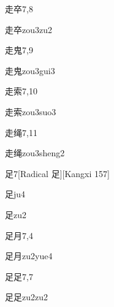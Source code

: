 \begin{entry}{走卒}{7,8}
  \begin{phonetics}{走卒}{zou3zu2}
  \end{phonetics}
\end{entry}

\begin{entry}{走鬼}{7,9}
  \begin{phonetics}{走鬼}{zou3gui3}
  \end{phonetics}
\end{entry}

\begin{entry}{走索}{7,10}
  \begin{phonetics}{走索}{zou3suo3}
  \end{phonetics}
\end{entry}

\begin{entry}{走绳}{7,11}
  \begin{phonetics}{走绳}{zou3sheng2}
  \end{phonetics}
\end{entry}

\begin{entry}{足}{7}[Radical 足][Kangxi 157]
  \begin{phonetics}{足}{ju4}
  \end{phonetics}
  \begin{phonetics}{足}{zu2}
  \end{phonetics}
\end{entry}

\begin{entry}{足月}{7,4}
  \begin{phonetics}{足月}{zu2yue4}
  \end{phonetics}
\end{entry}

\begin{entry}{足足}{7,7}
  \begin{phonetics}{足足}{zu2zu2}
  \end{phonetics}
\end{entry}

